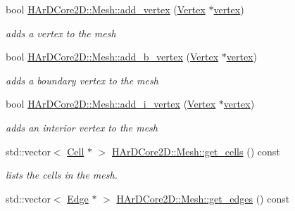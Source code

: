 \begin{DoxyCompactItemize}
\mbox{\label{group__Mesh_ga9dc43dcebaa54356ddbaa45fbd94fa1a}} 
bool \hyperlink{group__Mesh_ga9dc43dcebaa54356ddbaa45fbd94fa1a}{H\+Ar\+D\+Core2\+D\+::\+Mesh\+::add\+\_\+vertex} (\hyperlink{classHArDCore2D_1_1Vertex}{Vertex} $\ast$\hyperlink{classHArDCore2D_1_1Mesh_ad099224c697c05a57fad6a47fdcd9e76}{vertex})
\begin{DoxyCompactList}\small\item\em adds a vertex to the mesh \end{DoxyCompactList}\item 
\mbox{\label{group__Mesh_ga75f0405bae618848b2349ebb26eec675}} 
bool \hyperlink{group__Mesh_ga75f0405bae618848b2349ebb26eec675}{H\+Ar\+D\+Core2\+D\+::\+Mesh\+::add\+\_\+b\+\_\+vertex} (\hyperlink{classHArDCore2D_1_1Vertex}{Vertex} $\ast$\hyperlink{classHArDCore2D_1_1Mesh_ad099224c697c05a57fad6a47fdcd9e76}{vertex})
\begin{DoxyCompactList}\small\item\em adds a boundary vertex to the mesh \end{DoxyCompactList}\item 
\mbox{\label{group__Mesh_gae0eac0c28f63b2106e97e595cb95248e}} 
bool \hyperlink{group__Mesh_gae0eac0c28f63b2106e97e595cb95248e}{H\+Ar\+D\+Core2\+D\+::\+Mesh\+::add\+\_\+i\+\_\+vertex} (\hyperlink{classHArDCore2D_1_1Vertex}{Vertex} $\ast$\hyperlink{classHArDCore2D_1_1Mesh_ad099224c697c05a57fad6a47fdcd9e76}{vertex})
\begin{DoxyCompactList}\small\item\em adds an interior vertex to the mesh \end{DoxyCompactList}\item 
\mbox{\label{group__Mesh_gabae9df200fe23a302b3d01e4ff13f921}} 
std\+::vector$<$ \hyperlink{classHArDCore2D_1_1Cell}{Cell} $\ast$ $>$ \hyperlink{group__Mesh_gabae9df200fe23a302b3d01e4ff13f921}{H\+Ar\+D\+Core2\+D\+::\+Mesh\+::get\+\_\+cells} () const
\begin{DoxyCompactList}\small\item\em lists the cells in the mesh. \end{DoxyCompactList}\item 
\mbox{\label{group__Mesh_ga9a2d7a3f9f870455465e1a9204ee3d53}} 
std\+::vector$<$ \hyperlink{classHArDCore2D_1_1Edge}{Edge} $\ast$ $>$ \hyperlink{group__Mesh_ga9a2d7a3f9f870455465e1a9204ee3d53}{H\+Ar\+D\+Core2\+D\+::\+Mesh\+::get\+\_\+edges} () const

\end{DoxyCompactItemize}
